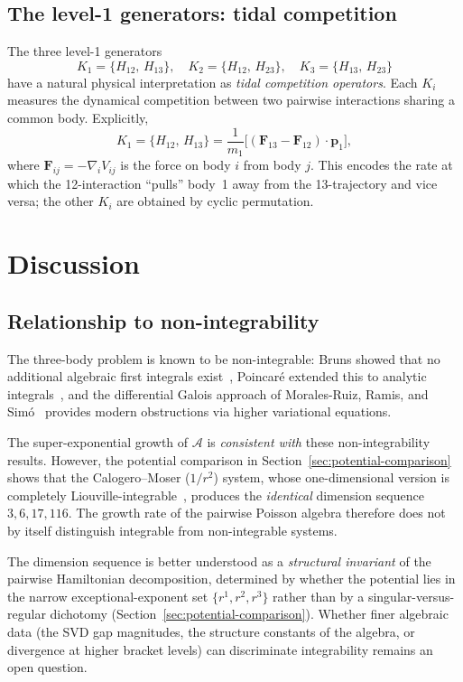 \documentclass[11pt,a4paper]{article}
\theoremstyle{remark}
\newcommand{\pb}[2]{\{#1,\,#2\}}
\newcommand{\cA}{\mathcal{A}}
\begin{document}
\subsection{The level-1 generators: tidal competition}

The three level-1 generators
\[
  K_1 = \pb{H_{12}}{H_{13}}, \quad
  K_2 = \pb{H_{12}}{H_{23}}, \quad
  K_3 = \pb{H_{13}}{H_{23}}
\]
have a natural physical interpretation as \emph{tidal competition
operators}.  Each $K_i$ measures the dynamical competition between
two pairwise interactions sharing a common body.  Explicitly,
\[
  K_1 = \pb{H_{12}}{H_{13}}
  = \frac{1}{m_1}\bigl[
    (\mathbf{F}_{13} - \mathbf{F}_{12}) \cdot \mathbf{p}_1
  \bigr],
\]
where $\mathbf{F}_{ij} = -\nabla_i V_{ij}$ is the force on body
$i$ from body $j$.  This encodes the rate at which the
12-interaction ``pulls'' body~1 away from the 13-trajectory and
vice versa; the other $K_i$ are obtained by cyclic permutation.


\section{Discussion}

\subsection{Relationship to non-integrability}

The three-body problem is known to be non-integrable: Bruns
showed that no additional algebraic first integrals
exist~\cite{bruns-1887}, Poincar\'{e} extended this to analytic
integrals~\cite{poincare-1890}, and the differential Galois
approach of Morales-Ruiz, Ramis, and
Sim\'{o}~\cite{morales-ramis-simo-2007} provides modern
obstructions via higher variational equations.

The super-exponential growth of $\cA$ is \emph{consistent with}
these non-integrability results.  However, the potential
comparison in Section~\ref{sec:potential-comparison} shows that the Calogero--Moser
($1/r^2$) system, whose one-dimensional version is completely
Liouville-integrable~\cite{moser-1975}, produces the
\emph{identical} dimension sequence $3, 6, 17, 116$.  The
growth rate of the pairwise Poisson algebra therefore does not
by itself distinguish integrable from non-integrable systems.

The dimension sequence is better understood as a
\emph{structural invariant} of the pairwise Hamiltonian
decomposition, determined by whether the potential lies in the
narrow exceptional-exponent set $\{r^1, r^2, r^3\}$ rather than
by a singular-versus-regular dichotomy
(Section~\ref{sec:potential-comparison}).  Whether finer algebraic data
(the SVD gap magnitudes, the structure constants of the
algebra, or divergence at higher bracket levels) can
discriminate integrability remains an open question.
\end{document}
